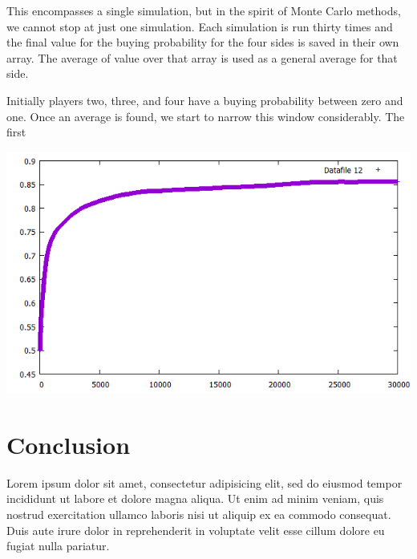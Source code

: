 \documentclass{article}
\begin{document}
This encompasses a single simulation, but in the spirit of Monte Carlo methods, we cannot stop at just one simulation.  Each simulation is run thirty times and the final value for the buying probability for the four sides is saved in their own array.  The average of value over that array is used as a general average for that side.

Initially players two, three, and four have a buying probability between zero and one.  Once an average is found, we start to narrow this window considerably.  The first

\begin{center}
\includegraphics[width = \textwidth]{average}
\end{center}

\section{Conclusion}

Lorem ipsum dolor sit amet, consectetur adipisicing elit, sed do eiusmod tempor
incididunt ut labore et dolore magna aliqua. Ut enim ad minim veniam, quis
nostrud exercitation ullamco laboris nisi ut aliquip ex ea commodo consequat.
Duis aute irure dolor in reprehenderit in voluptate velit esse cillum dolore eu
fugiat nulla pariatur.
\end{document}
